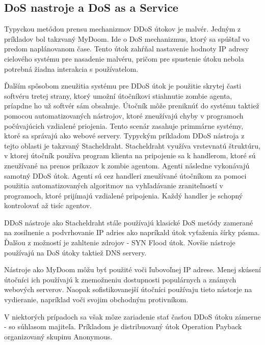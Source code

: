 \documentclass[
  printed, %
  table,   %
  lof,     %
  lot,     %
]{fithesis3}
\begin{document}
\subsection{DoS nastroje a DoS as a Service}
Typyckou metódou prensu mechanizmov DDoS útokov je malvér. Jedným z príkladov bol takzvaný MyDoom. Ide o DoS mechanizmus, ktorý sa spúštaľ vo predom naplánovanom čase. Tento útok zahŕňal nastavenie hodnoty IP adresy cielového systému pre nasadenie malvéru, pričom pre spustenie útoku nebola potrebná žiadna interakcia s používatelom.

Ďalším spôsobom zneužitia systému pre DDoS útok je použitie skrytej časti softvéru tretej strany, ktorý umožní útočníkovi stiahnutie zombie agenta, príapdne ho už softvér sám obsahuje. Útočník môže preniknúť do systému taktiež pomocou automatizovaných nástrojov, ktoré zneužívajú chyby v programoch počúvajúcich vzdialené priojenia. Tento scenár zasahuje primmárne systémy, ktoré sa správajú ako webové servery. Typyckým príkladom DDoS nástroja z tejto oblasti je takzvaný Stacheldraht. Stacheldraht využíva vrstevnatú štruktúru, v ktorej útočník používa program klienta na pripojenie sa k handlerom, ktoré sú zneužívané na prenos príkazov k zombie agentom. Agenti následne vykonávajú samotný DDoS útok.
Agenti sú cez handleri zneužívané útočníkom za pomoci použitia automatizovaných algoritmov na vyhľadávanie zraniteľností v programoch, ktoré prijímajú vzdialené pripojenia. Každý handler je schopný kontrolovať až tisíc agentov. 

DDoS nástroje ako Stacheldraht stále používajú klasické DoS metódy zamerané na zosilnenie a podvrhovanie IP adries ako napríkald útok vyťaženia šírky pásma. Ďalšou z možností je zahltenie zdrojov - SYN Flood útok. Novšie nástroje používajú na DoS útoky taktiež DNS servery.

Nástroje ako MyDoom môžu byť použité voči ľubovoľnej IP adrese. Menej skúsení útočníci ich používajú k znemožneniu dostupnosti populárnych a známych webových serverov. Naopak sofistikovanejší útočníci používaju tieto nástorje na vydieranie, napríklad voči svojim obchodným protivníkom.

V niektorých prípadoch sa však môze zariadenie stať časťou DDoS útoku zámerne - so súhlasom majiteľa. Príkladom je distribuovaný útok Operation Payback organizovaný skupinu Anonymous.
\end{document}
